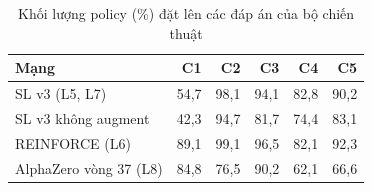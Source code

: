 \begin{table}[H]
  \centering
  \small
  \caption{Khối lượng policy (\%) đặt lên các đáp án của bộ chiến thuật}
  \label{tab:cs-mang-ct-khoiluong}
  \begin{tabular}{lrrrrr}
    \toprule
    Mạng & C1 & C2 & C3 & C4 & C5 \\
    \midrule
    SL v3 (L5, L7) & 54,7 & 98,1 & 94,1 & 82,8 & 90,2 \\
    SL v3 không augment & 42,3 & 94,7 & 81,7 & 74,4 & 83,1 \\
    REINFORCE (L6) & 89,1 & 99,1 & 96,5 & 82,1 & 92,3 \\
    AlphaZero vòng 37 (L8) & 84,8 & 76,5 & 90,2 & 62,1 & 66,6 \\
    \bottomrule
  \end{tabular}
\end{table}
